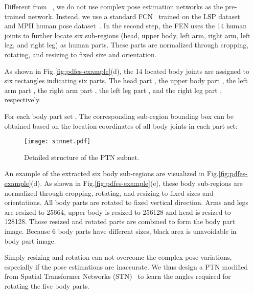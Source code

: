 \documentclass[10pt,twocolumn,letterpaper]{article}
\begin{document}
Different from~\cite{zheng2017pose,zhao2017spindle} , we do not use complex pose estimation networks as the pre-trained network. Instead, we use a standard FCN~\cite{long2015fully} trained on the LSP dataset~\cite{Johnson10} and MPII human pose dataset~\cite{andriluka20142d}. In the second step, the FEN uses the 14 human joints to further locate six sub-regions (head, upper body, left arm, right arm, left leg, and right leg) as human parts. These parts are normalized through cropping, rotating, and resizing to fixed size and orientation.

As shown in Fig.\ref{fig:pdfes-example}(d), the 14 located body joints are assigned to six rectangles indicating six parts. The head part , the upper body part , the left arm part , the right arm part , the left leg part , and the right leg part , respectively.

For each body part set , The corresponding sub-region bounding box  can be obtained based on the location coordinates of all body joints in each part set:



\begin{figure}
\centering \texttt{[image: stnnet.pdf]}\\
\vspace{-3mm}
\caption{Detailed structure of the PTN subnet.}
\vspace{-4mm}
\label{fig:PTN1}\end{figure}


An example of the extracted six body sub-regions are visualized in Fig.\ref{fig:pdfes-example}(d). As shown in Fig.\ref{fig:pdfes-example}(e), these body sub-regions are normalized through cropping, rotating, and resizing to fixed sizes and orientations. All body parts are rotated to fixed vertical direction. Arms and legs are resized to 25664, upper body is resized to 256128 and head is resized to 128128. Those resized and rotated parts are combined to form the body part image. Because 6 body parts have different sizes, black area is unavoidable in body part image.

Simply resizing and rotation can not overcome the complex pose variations, especially if the pose estimations are inaccurate. We thus design a PTN modified from Spatial Transformer Networks (STN)~\cite{jaderberg2015spatial} to learn the angles required for rotating the five body parts.
\end{document}
